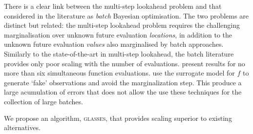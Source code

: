 \documentclass{article} %
\newcommand{\acr}[1]{\textsc{#1}\xspace}
\newcommand{\us}{\acr{glasses}}
\begin{document}
There is a clear link between the multi-step lookahead problem and that considered in the literature as \emph{batch} Bayesian optimisation. 
The two problems are distinct but related: the multi-step lookahead problem requires the challenging marginalisation over unknown future evaluation \emph{locations}, in addition to the unknown future evaluation \emph{values} also marginalised by batch approaches. 
Similarly to the state-of-the-art in multi-step lookahead, the batch literature provides only poor scaling with the number of evaluations.
\cite{Ginsbourger2009} present results for no more than six simultaneous function evaluations.\cite{Azimi2012,Azimi2011} use the surrogate model for $f$ to generate `fake' observations and avoid the marginalization step. This produce a large acumulation of errors that does not allow the use these techniques for the collection of large batches.


We propose an algorithm, \us, that provides scaling superior to existing alternatives.

\end{document}
